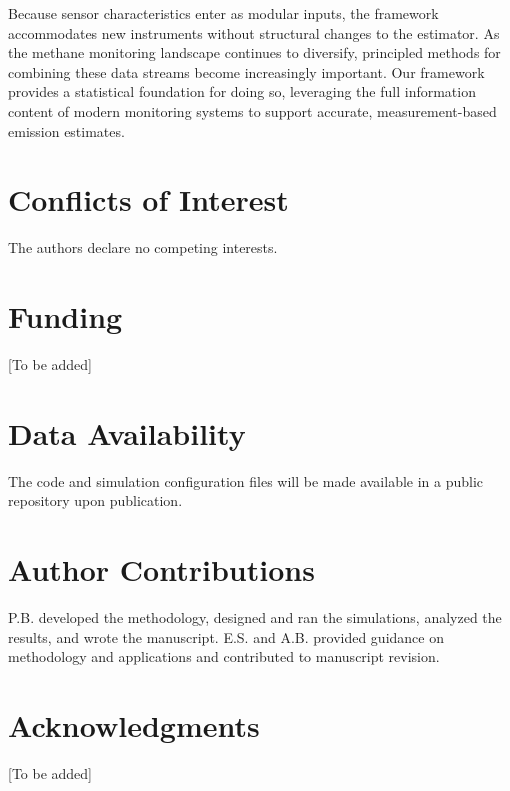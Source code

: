 \documentclass[unnumsec,webpdf,modern,mediumone]{oup-authoring-template}
\begin{document}
Because sensor characteristics enter as modular inputs, the framework accommodates new instruments without structural changes to the estimator. As the methane monitoring landscape continues to diversify, principled methods for combining these data streams become increasingly important. Our framework provides a statistical foundation for doing so, leveraging the full information content of modern monitoring systems to support accurate, measurement-based emission estimates.

\section{Conflicts of Interest}

The authors declare no competing interests.

\section{Funding}

[To be added]

\section{Data Availability}

The code and simulation configuration files will be made available in a public repository upon publication.

\section{Author Contributions}

P.B. developed the methodology, designed and ran the simulations, analyzed the results, and wrote the manuscript. E.S. and A.B. provided guidance on methodology and applications and contributed to manuscript revision.

\section{Acknowledgments}

[To be added]



\end{document}
